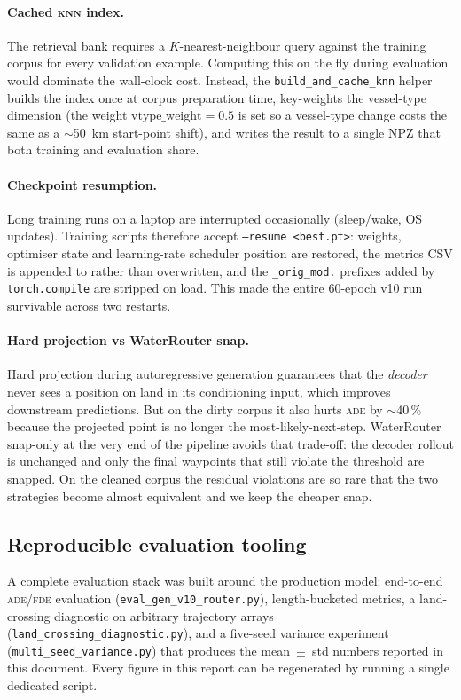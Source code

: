 \documentclass[11pt,a4paper]{article}
\newcommand{\ade}{\textsc{ade}}
\newcommand{\fde}{\textsc{fde}}
\newcommand{\code}[1]{\texttt{\small #1}}
\begin{document}
\paragraph{Cached \textsc{knn} index.}
The retrieval bank requires a $K$-nearest-neighbour query against the
training corpus for every validation example.  Computing this on the
fly during evaluation would dominate the wall-clock cost.  Instead, the
\code{build\_and\_cache\_knn} helper builds the index once at corpus
preparation time, key-weights the vessel-type dimension (the weight
$\mathrm{vtype\_weight} = 0.5$ is set so a vessel-type change costs the
same as a $\sim$50~km start-point shift), and writes the result to a
single NPZ that both training and evaluation share.

\paragraph{Checkpoint resumption.}
Long training runs on a laptop are interrupted occasionally
(sleep/wake, OS updates).  Training scripts therefore accept
\code{--resume <best.pt>}: weights, optimiser state and learning-rate
scheduler position are restored, the metrics CSV is appended to rather
than overwritten, and the \code{\_orig\_mod.} prefixes added by
\code{torch.compile} are stripped on load.  This made the entire
60-epoch v10 run survivable across two restarts.

\paragraph{Hard projection vs WaterRouter snap.}
Hard projection during autoregressive generation guarantees that the
\emph{decoder} never sees a position on land in its conditioning input,
which improves downstream predictions.  But on the dirty corpus it also
hurts \ade{} by $\sim$40\,\% because the projected point is no longer
the most-likely-next-step.  WaterRouter snap-only at the very end of
the pipeline avoids that trade-off: the decoder rollout is unchanged
and only the final waypoints that still violate the threshold are
snapped.  On the cleaned corpus the residual violations are so rare
that the two strategies become almost equivalent and we keep the
cheaper snap.

\subsection{Reproducible evaluation tooling}

A complete evaluation stack was built around the production model:
end-to-end \ade/\fde{} evaluation
(\code{eval\_gen\_v10\_router.py}), length-bucketed metrics, a
land-crossing diagnostic on arbitrary trajectory arrays
(\code{land\_crossing\_diagnostic.py}), and a five-seed variance
experiment (\code{multi\_seed\_variance.py}) that produces the
mean~$\pm$~std numbers reported in this document.  Every figure in this
report can be regenerated by running a single dedicated script.
\end{document}
